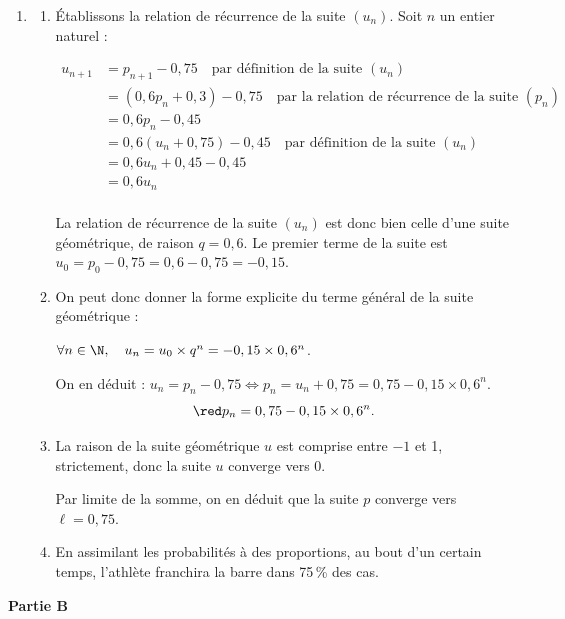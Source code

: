 \begin{enumerate}
\item
\begin{enumerate}
\item  Établissons la relation de récurrence de la suite $(u_n)$. Soit $n$ un entier naturel :

$\begin{aligned} u_{n+1} &= p_{n+1} - 0,75 \quad \text{par définition de la suite } (u_n)\\
				&= (0,6p_n + 0,3) - 0,75 \quad \text{par la relation de récurrence de la suite } (p_n)\\
				&= 0,6p_n - 0,45\\
				&= 0,6(u_n + 0,75)-0,45\quad \text{par définition de la suite } (u_n)\\
				&=0,6u_n+0,45-0,45\\
				&= 0,6u_n \\ \end{aligned}$

				La relation de récurrence de la suite $(u_n)$ est donc bien celle d'une suite géométrique, de raison $q = 0,6$. Le premier terme de la suite est $u_0 = p_0 - 0,75 = 0,6 - 0,75 = - 0,15$.
\item On peut donc donner la forme explicite du terme général de la suite géométrique :

$\forall n \in \N, \quad u_n = u_0 \times q^n = -0,15\times 0,6^n$.

On en déduit : $u_n = p_n - 0,75 \iff p_n = u_n + 0,75 = 0,75 - 0,15\times 0,6^n.$
\[\red p_n = 0,75 - 0,15\times 0,6^n.\]
\item La raison de la suite géométrique $u$ est comprise entre $-1$ et 1, strictement, donc la suite $u$ converge vers 0.

Par limite de la somme, on en déduit que la suite $p$ converge vers $\ell=0,75$.
\item En assimilant les probabilités à des proportions,  au bout d'un certain temps,  l'athlète franchira la barre  dans 75\,\% des cas.
\end{enumerate}

\end{enumerate}

\textbf{Partie B}

